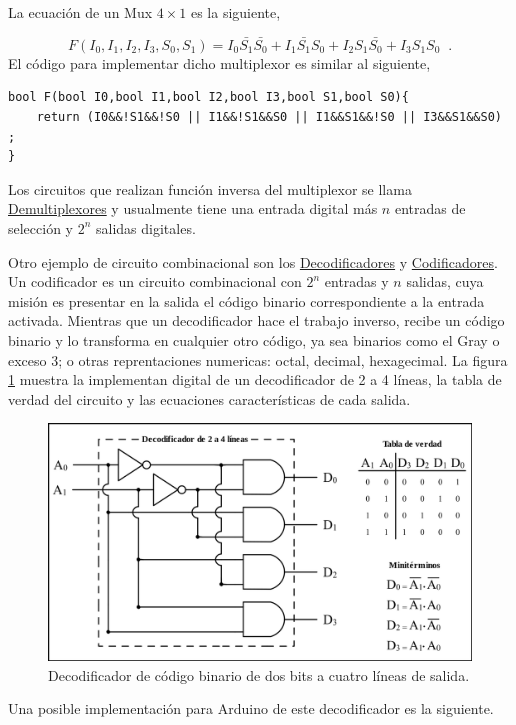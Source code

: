 La ecuación de un Mux $4 \times 1$ es la siguiente,

\begin{equation}
	F(I_0,I_1,I_2,I_3,S_0,S_1)=I_0\bar{S_1}\bar{S_0}+I_1\bar{S_1}S_0+I_2S_1\bar{S_0}+I_3S_1S_0  \;\; .
\end{equation} El código para implementar dicho multiplexor es similar al siguiente,
{\footnotesize 
\begin{lstlisting}[language=Arduino,numbers=none, showstringspaces=false]
bool F(bool I0,bool I1,bool I2,bool I3,bool S1,bool S0){
	return (I0&&!S1&&!S0 || I1&&!S1&&S0 || I1&&S1&&!S0 || I3&&S1&&S0) ;
}
\end{lstlisting}
}
Los circuitos que realizan función inversa del multiplexor se  llama \href{https://es.wikipedia.org/wiki/Demultiplexor}{Demultiplexores}  y usualmente tiene una entrada digital más $n$ entradas de selección y $2^{n}$ salidas digitales.

Otro ejemplo de circuito combinacional son los \href{URL}{Decodificadores} y \href{https://es.wikipedia.org/wiki/Codificador}{Codificadores}.  Un codificador es un circuito combinacional con $2^{n}$ entradas y $n$ salidas, cuya misión es presentar en la salida el código binario correspondiente a la entrada activada. Mientras que un decodificador hace el trabajo inverso, recibe un código binario y lo transforma en cualquier otro código, ya sea  binarios como el Gray o exceso 3; o otras reprentaciones numericas: octal, decimal, hexagecimal. La figura \ref{fig:decoderexample} muestra la implementan digital de un decodificador de 2 a 4 líneas, la tabla de verdad del circuito y las ecuaciones características de cada salida. 
\begin{figure}
	\centering
	\includegraphics[width=0.7\linewidth]{fig/Decoder_Example.png}
	\caption{Decodificador de código binario de dos bits a cuatro líneas de salida.  }
	\label{fig:decoderexample}
\end{figure}

Una posible implementación para Arduino de este decodificador es la siguiente.


